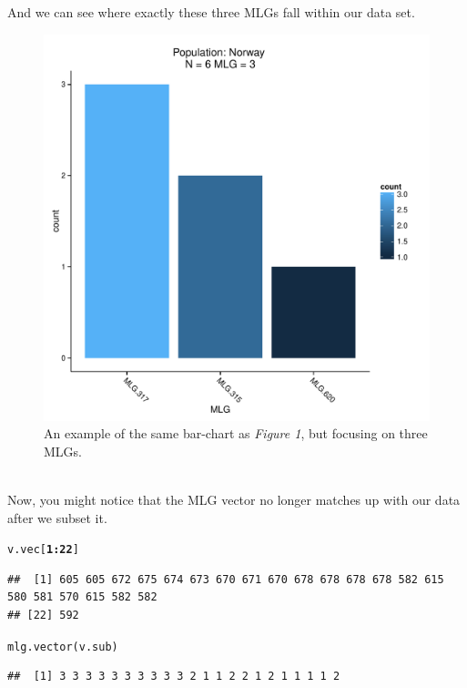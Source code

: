 \documentclass[letterpaper]{article}\usepackage[]{graphicx}\usepackage[]{color}
\makeatletter
\newcommand{\hlnum}[1]{\textcolor[rgb]{0.502,0,0.502}{\textbf{#1}}}%
\newcommand{\hlopt}[1]{\textcolor[rgb]{1,0,0.502}{\textbf{#1}}}%
\newcommand{\hlstd}[1]{\textcolor[rgb]{0,0,0}{#1}}%
\newcommand{\hlkwd}[1]{\textcolor[rgb]{0,0.267,0.4}{#1}}%
\newenvironment{kframe}{%
 \def\at@end@of@kframe{}%
 \ifinner\ifhmode%
  \def\at@end@of@kframe{\end{minipage}}%
  \begin{minipage}{\columnwidth}%
 \fi\fi%
 \def\FrameCommand##1{\hskip\@totalleftmargin \hskip-\fboxsep
 \colorbox{shadecolor}{##1}\hskip-\fboxsep
     \hskip-\linewidth \hskip-\@totalleftmargin \hskip\columnwidth}%
 \MakeFramed {\advance\hsize-\width
   \@totalleftmargin\z@ \linewidth\hsize
   \@setminipage}}%
 {\par\unskip\endMakeFramed%
 \at@end@of@kframe}
\newenvironment{knitrout}{}{} %
\makeatother
\begin{document}
And we can see where exactly these three MLGs fall within our data set.
\begin{figure}[h!]
  \centering
  \caption{\footnotesize An example of the same bar-chart as \textit{Figure 1}, but focusing on three MLGs.}
  \label{nortable2}
\begin{knitrout}\footnotesize
{}\color{fgcolor}

{\centering \includegraphics[width=0.5\linewidth]{figure/subnor} 

}



\end{knitrout}

\end{figure}
\\
\newpage
Now, you might notice that the MLG vector no longer matches up with our data after we subset it.
\begin{knitrout}\footnotesize
{}\color{fgcolor}\begin{kframe}
\begin{alltt}
\hlstd{v.vec[}\hlnum{1}\hlopt{:}\hlnum{22}\hlstd{]}
\end{alltt}
\begin{verbatim}
##  [1] 605 605 672 675 674 673 670 671 670 678 678 678 678 582 615 580 581 570 615 582 582
## [22] 592
\end{verbatim}
\begin{alltt}
\hlkwd{mlg.vector}\hlstd{(v.sub)}
\end{alltt}
\begin{verbatim}
##  [1] 3 3 3 3 3 3 3 3 3 3 2 1 1 2 2 1 2 1 1 1 1 2
\end{verbatim}
\end{kframe}
\end{knitrout}
\end{document}
